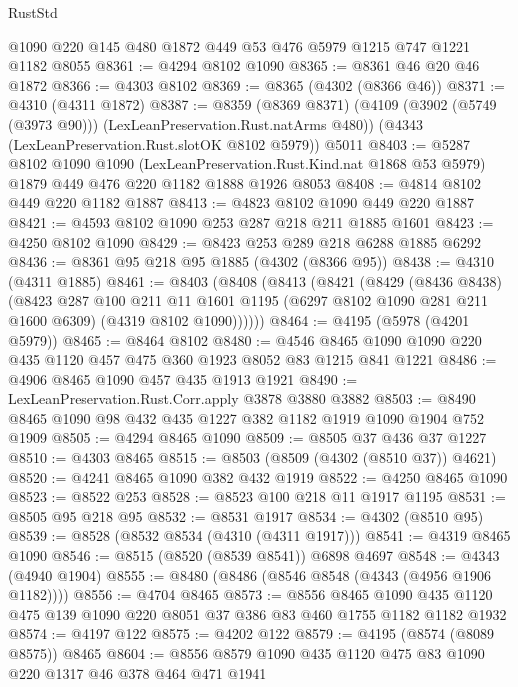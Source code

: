 \begin{lexlean}{RustStd}
\begin{coremodule}
    @1090
    @220
    @145
    @480
    @1872
    @449
    @53
    @476
    @5979
    @1215
    @747
    @1221
    @1182
    @8055
@8361 := @4294 @8102 @1090
@8365 := @8361 @46 @20 @46 @1872
@8366 := @4303 @8102
@8369 := @8365 (@4302 (@8366 @46))
@8371 := @4310 (@4311 @1872)
@8387 := @8359
    (@8369 @8371)
    (@4109 (@3902 (@5749 (@3973 @90))) (LexLeanPreservation.Rust.natArms @480))
    (@4343 (LexLeanPreservation.Rust.slotOK @8102 @5979))
    @5011
@8403 := @5287
    @8102
    @1090
    @1090
    (LexLeanPreservation.Rust.Kind.nat @1868 @53 @5979)
    @1879
    @449
    @476
    @220
    @1182
    @1888
    @1926
    @8053
@8408 := @4814 @8102 @449 @220 @1182 @1887
@8413 := @4823 @8102 @1090 @449 @220 @1887
@8421 := @4593 @8102 @1090 @253 @287 @218 @211 @1885 @1601
@8423 := @4250 @8102 @1090
@8429 := @8423 @253 @289 @218 @6288 @1885 @6292
@8436 := @8361 @95 @218 @95 @1885 (@4302 (@8366 @95))
@8438 := @4310 (@4311 @1885)
@8461 := @8403
    (@8408
      (@8413
        (@8421
          (@8429
            (@8436 @8438)
            (@8423
              @287
              @100
              @211
              @11
              @1601
              @1195
              (@6297 @8102 @1090 @281 @211 @1600 @6309)
              (@4319 @8102 @1090))))))
@8464 := @4195 (@5978 (@4201 @5979))
@8465 := @8464 @8102
@8480 := @4546 @8465 @1090 @1090 @220 @435 @1120 @457 @475 @360 @1923 @8052 @83 @1215 @841 @1221
@8486 := @4906 @8465 @1090 @457 @435 @1913 @1921
@8490 := LexLeanPreservation.Rust.Corr.apply @3878 @3880 @3882
@8503 := @8490 @8465 @1090 @98 @432 @435 @1227 @382 @1182 @1919 @1090 @1904 @752 @1909
@8505 := @4294 @8465 @1090
@8509 := @8505 @37 @436 @37 @1227
@8510 := @4303 @8465
@8515 := @8503 (@8509 (@4302 (@8510 @37)) @4621)
@8520 := @4241 @8465 @1090 @382 @432 @1919
@8522 := @4250 @8465 @1090
@8523 := @8522 @253
@8528 := @8523 @100 @218 @11 @1917 @1195
@8531 := @8505 @95 @218 @95
@8532 := @8531 @1917
@8534 := @4302 (@8510 @95)
@8539 := @8528 (@8532 @8534 (@4310 (@4311 @1917)))
@8541 := @4319 @8465 @1090
@8546 := @8515 (@8520 (@8539 @8541)) @6898 @4697
@8548 := @4343 (@4940 @1904)
@8555 := @8480 (@8486 (@8546 @8548 (@4343 (@4956 @1906 @1182))))
@8556 := @4704 @8465
@8573 := @8556
    @8465
    @1090
    @435
    @1120
    @475
    @139
    @1090
    @220
    @8051
    @37
    @386
    @83
    @460
    @1755
    @1182
    @1182
    @1932
@8574 := @4197 @122
@8575 := @4202 @122
@8579 := @4195 (@8574 (@8089 @8575)) @8465
@8604 := @8556
    @8579
    @1090
    @435
    @1120
    @475
    @83
    @1090
    @220
    @1317
    @46
    @378
    @464
    @471
    @1941

\end{coremodule}
\end{lexlean}
